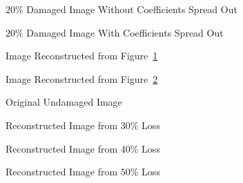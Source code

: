 \begin{figure}
\centerline{}
\vspace{-.1in}
\caption{$20\%$ Damaged Image Without Coefficients Spread Out}
\label{fig-bad-20no}
\end{figure}
            
\begin{figure}
\centerline{}
\caption{$20\%$ Damaged Image With Coefficients Spread Out}
\label{fig-bad-20yes}
\end{figure}
            
\begin{figure}
\centerline{}
\caption{Image Reconstructed from Figure~\ref{fig-bad-20no}}
\label{fig-reconst-20no}
\end{figure}
            
\begin{figure}
\centerline{}
\caption{Image Reconstructed from Figure~\ref{fig-bad-20yes}}
\label{fig-reconst-20yes}
\end{figure}
            
\begin{figure}
\centerline{}
\caption{Original Undamaged Image}
\label{fig-gold}
\end{figure}
            
\begin{figure}
\centerline{}
\caption{Reconstructed Image from $30\%$ Loss}
\label{fig-reconst-30}
\end{figure}
            
\begin{figure}
\centerline{}
\caption{Reconstructed Image from $40\%$ Loss}
\label{fig-reconst-40}
\end{figure}
            
\begin{figure}
\centerline{}
\caption{Reconstructed Image from $50\%$ Loss}
\label{fig-reconst-50}
\end{figure}
            
            
